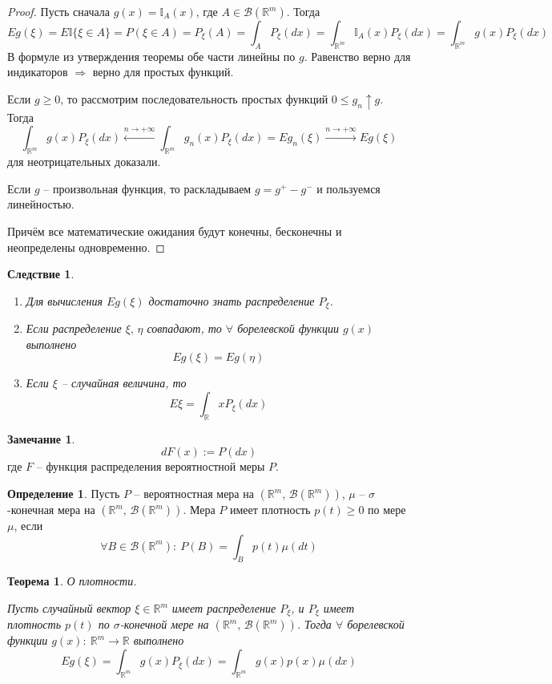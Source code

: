 \documentclass[a4paper,12pt]{article}
\renewcommand{\leq}{\ensuremath{\leqslant}}
\renewcommand{\geq}{\ensuremath{\geqslant}}
\theoremstyle{plain}
\newtheorem{theorem}{Теорема}[section]
\newtheorem*{corollary}{Следствие}
\theoremstyle{definition}
\newtheorem{definition}{Определение}[section]
\newtheorem*{note}{Замечание}
\theoremstyle{remark}
\begin{document}
\begin{proof}
  Пусть сначала $g(x) = \mathbb{I}_A(x)$, где $A \in \mathcal{B}(\mathbb{R}^m)$. Тогда 
  \[
    Eg(\xi) = E\mathbb{I}\{\xi \in A\} = P(\xi \in A) = P_\xi(A) = \int_A P_\xi(dx) = \int_{\mathbb{R}^m}\mathbb{I}_A(x)P_\xi(dx) = \int_{\mathbb{R}^m}g(x)P_\xi(dx)
  \]
  В формуле из утверждения теоремы обе части линейны по $g$. Равенство верно для индикаторов $\Rightarrow$ верно для простых функций.

  Если $g \geq 0$, то рассмотрим последовательность простых функций $0 \leq g_n \uparrow g$. Тогда 
  \[\int_{\mathbb{R}^m}g(x)P_\xi(dx) \stackrel{n \to +\infty}{\leftarrow} \int_{\mathbb{R}^m}g_n(x)P_\xi(dx) = Eg_n(\xi) \stackrel{n \to +\infty}{\to} Eg(\xi)\]
  для неотрицательных доказали.

  Если $g$ -- произвольная функция, то раскладываем $g = g^+ - g^-$ и пользуемся линейностью.

  Причём все математические ожидания будут конечны, бесконечны и неопределены одновременно.
\end{proof}

\begin{corollary}
  \begin{enumerate}
    \item Для вычисления $Eg(\xi)$ достаточно знать распределение $P_\xi$.
    \item Если распределение $\xi,\, \eta$ совпадают, то $\forall$ борелевской функции $g(x)$ выполнено
    \[Eg(\xi) = Eg(\eta)\]
    \item Если $\xi$ -- случайная величина, то
    \[E\xi = \int_\mathbb{R} xP_\xi(dx)\]
  \end{enumerate}
\end{corollary}

\begin{note}
  \[dF(x) := P(dx)\]
  где $F$ -- функция распределения вероятностной меры $P$.
\end{note}

\begin{definition}
  Пусть $P$ -- вероятностная мера на $(\mathbb{R}^m,\, \mathcal{B}(\mathbb{R}^m))$, $\mu$ -- $\sigma$-конечная мера на $(\mathbb{R}^m,\, \mathcal{B}(\mathbb{R}^m))$. Мера $P$ имеет плотность $p(t) \geq 0$ по мере $\mu$, если 
  \[\forall B \in \mathcal{B}(\mathbb{R}^m) :\: P(B) = \int_B p(t)\mu(dt)\]
\end{definition}

\begin{theorem}
  О плотности.
  
  Пусть случайный вектор $\xi \in \mathbb{R}^m$ имеет распределение $P_\xi$, и $P_\xi$ имеет плотность $p(t)$ по $\sigma$-конечной мере на $(\mathbb{R}^m,\, \mathcal{B}(\mathbb{R}^m))$. Тогда $\forall$ борелевской функции $g(x) :\: \mathbb{R}^m \to \mathbb{R}$ выполнено
  \[Eg(\xi) = \int_{\mathbb{R}^m}g(x)P_\xi(dx) = \int_{\mathbb{R}^m}g(x)p(x)\mu(dx)\]
\end{theorem}
\end{document}
